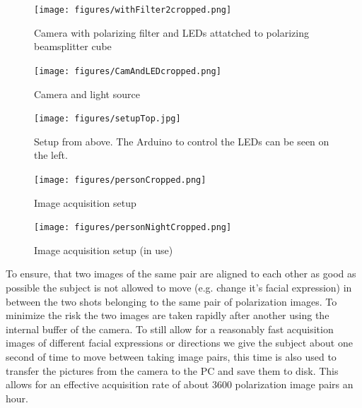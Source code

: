 \documentclass[sigconf]{acmart}
\begin{document}
\begin{figure}
\texttt{[image: figures/withFilter2cropped.png]} 
\caption{Camera with polarizing filter and LEDs attatched to polarizing beamsplitter cube}
\label{fig:setupWithFilter}
\end{figure}

\begin{figure}
\texttt{[image: figures/CamAndLEDcropped.png]} 
\caption{Camera and light source}
\label{fig:setupWithoutFilter}
\end{figure}

\begin{figure}
\texttt{[image: figures/setupTop.jpg]} 
\caption{Setup from above. The Arduino to control the LEDs can be seen on the left.}
\label{fig:setupTop}
\end{figure}

\begin{figure}
\texttt{[image: figures/personCropped.png]} 
\caption{Image acquisition setup}
\label{fig:personDay}
\end{figure}

\begin{figure}
\texttt{[image: figures/personNightCropped.png]} 
\caption{Image acquisition setup (in use)}
\label{fig:personNight}
\end{figure}

To ensure, that two images of the same pair are aligned to each other as good as possible the subject is not allowed to move (e.g. change it's facial expression) in between the two shots belonging to the same pair of polarization images. To minimize the risk the two images are taken rapidly after another using the internal buffer of the camera. To still allow for a reasonably fast acquisition images of different facial expressions or directions we give the subject about one second of time to move between taking image pairs, this time is also used to transfer the pictures from the camera to the PC and save them to disk. This allows for an effective acquisition rate of about 3600 polarization image pairs an hour.
\end{document}
